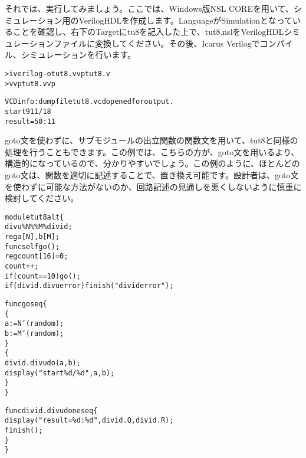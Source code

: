 それでは、実行してみましょう。ここでは、Windows版NSL COREを用いて、シミュレーション用のVerilogHDLを作成します。LanguageがSimulationとなっていることを確認し、右下のTargetにtu8を記入した上で、tut8.nslをVerilogHDLシミュレーションファイルに変換してください。その後、Icarus Verilogでコンパイル、シミュレーションを行います。

\begin{reviewcmd}
\begin{alltt}
\textgreater{} iverilog -o tut8.vvp tut8.v
\textgreater{} vvp tut8.vvp

VCD info: dumpfile tut8.vcd opened for output.
start  911/ 18
result =   50 :  11
\end{alltt}
\end{reviewcmd}

goto文を使わずに、サブモジュールの出立関数の関数文を用いて、tut8と同様の処理を行うこともできます。この例では、こちらの方が、goto文を用いるより、構造的になっているので、分かりやすいでしょう。この例のように、ほとんどのgoto文は、関数を適切に記述することで、置き換え可能です。設計者は、goto文を使わずに可能な方法がないのか、回路記述の見通しを悪くしないように慎重に検討してください。

\begin{reviewlist}
\begin{alltt}
module tut8\textunderscore{}alt \{
   divu\textunderscore{}\%N\%\textunderscore{}\%M\%  divid;
   reg  a[N], b[M];
   func\textunderscore{}self go();
   reg count[16]=0;
   count++;
   if(count == 10) go();
   if(divid.divu\textunderscore{}error) \textunderscore{}finish("divid error");

   func go seq \{
       \{
           a:=N'(\textunderscore{}random);
           b:=M'(\textunderscore{}random);
       \}
       \{
           divid.divu\textunderscore{}do(a,b);
           \textunderscore{}display("start \%d/\%d",a,b);
       \}
   \}

   func divid.divu\textunderscore{}done seq \{
       \textunderscore{}display("result = \%d : \%d",divid.Q, divid.R);
       \textunderscore{}finish();
   \}
\}
\end{alltt}
\end{reviewlist}

